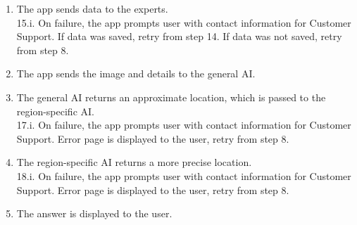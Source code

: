 \documentclass[]{article}
\begin{document}
\begin{enumerate}[{\bf BE1.}]
\begin{enumerate}[{1.}]
                        \item The app sends data to the experts. \\ 15.i. On failure, the app prompts user with contact information for Customer Support. If data was saved, retry from step 14. If data was not saved, retry from step 8. 
                        \item The app sends the image and details to the general AI. 
                        \item The general AI returns an approximate location, which is passed to the region-specific AI. \\ 17.i. On failure, the app prompts user with contact information for Customer Support. Error page is displayed to the user, retry from step 8. 
                        \item The region-specific AI returns a more precise location. \\ 18.i. On failure, the app prompts user with contact information for Customer Support. Error page is displayed to the user, retry from step 8.
                        \item The answer is displayed to the user. 
                \end{enumerate}
                    

\end{enumerate}
\end{document}
